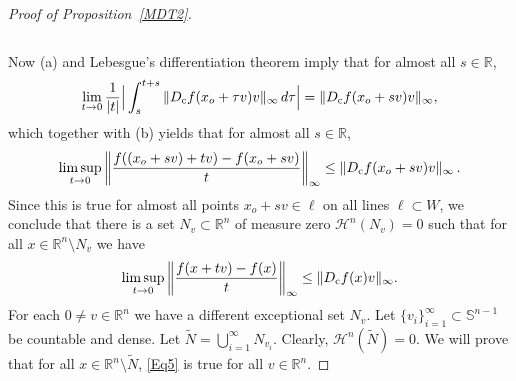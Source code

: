 \documentclass[12pt,leqno]{amsart}
\theoremstyle{definition}
\newcommand{\bbbr}{\mathbb R}
\newcommand{\Sph}{\mathbb S}
\def\H{{\mathcal H}}
\numberwithin{theorem}{section} \numberwithin{equation}{section}
\begin{document}
\begin{proof}[Proof of Proposition~\ref{MDT2}]
\begin{enumerate}
$$$$
\end{enumerate}
Now (a) and Lebesgue's differentiation theorem imply that for almost all $s\in\bbbr$,
$$
\lim_{t\to 0} \frac{1}{|t|}\Big|\int_s^{t+s} \Vert D_{\rm c}f(x_o+\tau v)v\Vert_\infty\, d\tau\Big| = \Vert D_{\rm c}f(x_o+sv)v\Vert_\infty,
$$
which together with (b) yields that for almost all $s\in\bbbr$,
$$
\limsup_{t\to 0} \left\Vert \frac{f((x_o+sv)+tv)-f(x_o+sv)}{t}\right\Vert_\infty \leq \Vert D_{\rm c}f(x_o+sv)v\Vert_\infty \, .
$$
Since this is true for almost all points $x_o+sv\in \ell$ on all lines $\ell\subset W$, we conclude that there is a set $N_v\subset\bbbr^n$ of measure zero $\H^n(N_v)=0$ such that
for all $x\in \bbbr^n\setminus N_v$ we have
\begin{equation}
\label{Eq5}
\limsup_{t\to 0} \left\Vert \frac{f(x+tv)-f(x)}{t}\right\Vert_\infty \leq \Vert D_{\rm c}f(x)v\Vert_\infty.
\end{equation}
For each $0\neq v\in\bbbr^n$ we have a different exceptional set $N_v$.
Let $\{v_i\}_{i=1}^\infty\subset\Sph^{n-1}$ be countable and dense. Let $\tilde{N}=\bigcup_{i=1}^\infty N_{v_i}$. Clearly, $\H^n(\tilde{N})=0$. We will prove that for all $x\in\bbbr^n\setminus\tilde{N}$, \eqref{Eq5} is true for all $v\in\bbbr^n$.


\end{proof}
\end{document}
